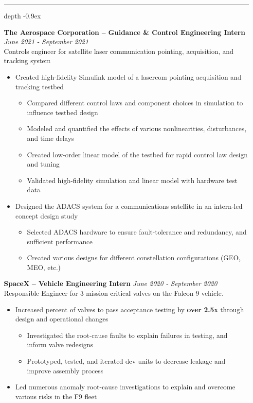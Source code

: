 \documentclass[11pt, letterpaper]{article}
\newcommand\smallspace{3.5pt}
\newcommand\indentlength{0.25in}
\def\Vhrulefill{\leavevmode\leaders\hrule height 1ex depth \dimexpr0.1pt-0.9ex\hfill\kern0pt}
\newenvironment{category}[1]
{
	\vspace{\smallspace}
	\noindent {\LARGE{\sc{#1}}} \hspace{2pt}
	\Vhrulefill
	\vspace{\smallspace}
	\begin{addmargin}[\indentlength]{0in}
}
{
	\end{addmargin}
	\vspace{\smallspace}
}
\newenvironment{experience}[4][3]{
	\vspace{\smallspace}
	\noindent\textbf{#2}
	\hfill \textit{#3} \\
	#4
	\vspace{\smallspace}
	\begin{itemize}
	}
	{
	\end{itemize}
	\vspace{\smallspace}
}
\begin{document}
\begin{category}{Work Experience}
\begin{experience}{The Aerospace Corporation -- Guidance \& Control Engineering Intern}{June 2021 - September 2021}{Controls engineer for satellite laser communication pointing, acquisition, and tracking system}
	\item Created high-fidelity Simulink model of a lasercom pointing acquisition and tracking testbed
	\begin{itemize}[noitemsep,nolistsep]
		\item Compared different control laws and component choices in simulation to influence testbed design
		\item Modeled and quantified the effects of various nonlinearities, disturbances, and time delays
		\item Created low-order linear model of the testbed for rapid control law design and tuning
		\item Validated high-fidelity simulation and linear model with hardware test data
	\end{itemize}
	\item Designed the ADACS system for a communications satellite  in an intern-led concept design study
	\begin{itemize}[noitemsep,nolistsep]
		\item Selected ADACS hardware to ensure fault-tolerance and redundancy, and sufficient performance
		\item Created various designs for different constellation configurations (GEO, MEO, etc.)
	\end{itemize}
\end{experience}

\begin{experience}{SpaceX -- Vehicle Engineering Intern}{June 2020 - September 2020}{Responsible Engineer for 3 mission-critical valves on the Falcon 9 vehicle.}
	\item Increased percent of valves to pass acceptance testing by \textbf{over 2.5x} through design and operational changes
	\begin{itemize}[noitemsep,nolistsep]
		\item Investigated the root-cause faults to explain failures in testing, and inform valve redesigns
		\item Prototyped, tested, and iterated dev units to decrease leakage and improve assembly process
	\end{itemize}
	\item Led numerous anomaly root-cause investigations to explain and overcome various risks in the F9 fleet
\end{experience}


\end{category}
\end{document}
